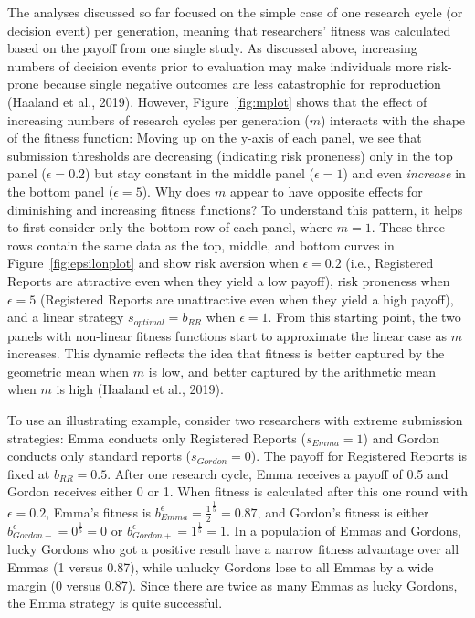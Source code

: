 \documentclass[
  ,man,mask,floatsintext]{apa6}
\begin{document}
The analyses discussed so far focused on the simple case of one research cycle (or decision event) per generation, meaning that researchers' fitness was calculated based on the payoff from one single study.
As discussed above, increasing numbers of decision events prior to evaluation may make individuals more risk-prone because single negative outcomes are less catastrophic for reproduction (Haaland et al., 2019).
However, Figure~\ref{fig:mplot} shows that the effect of increasing numbers of research cycles per generation (\(m\)) interacts with the shape of the fitness function:
Moving up on the y-axis of each panel, we see that submission thresholds are decreasing (indicating risk proneness) only in the top panel (\(\epsilon = 0.2\)) but stay constant in the middle panel (\(\epsilon = 1\)) and even \emph{increase} in the bottom panel (\(\epsilon = 5\)).
Why does \(m\) appear to have opposite effects for diminishing and increasing fitness functions?
To understand this pattern, it helps to first consider only the bottom row of each panel, where \(m = 1\).
These three rows contain the same data as the top, middle, and bottom curves in Figure~\ref{fig:epsilonplot} and show risk aversion when \(\epsilon = 0.2\) (i.e., Registered Reports are attractive even when they yield a low payoff), risk proneness when \(\epsilon = 5\) (Registered Reports are unattractive even when they yield a high payoff), and a linear strategy \(s_{optimal} = b_{RR}\) when \(\epsilon = 1\).
From this starting point, the two panels with non-linear fitness functions start to approximate the linear case as \(m\) increases.
This dynamic reflects the idea that fitness is better captured by the geometric mean when \(m\) is low, and better captured by the arithmetic mean when \(m\) is high (Haaland et al., 2019).

To use an illustrating example, consider two researchers with extreme submission strategies:
Emma conducts only Registered Reports (\(s_{Emma} = 1\)) and Gordon conducts only standard reports (\(s_{Gordon} = 0\)).
The payoff for Registered Reports is fixed at \(b_{RR} = 0.5\).
After one research cycle, Emma receives a payoff of 0.5 and Gordon receives either 0 or 1.
When fitness is calculated after this one round with \(\epsilon = 0.2\), Emma's fitness is \(b_{Emma}^{\epsilon} = \frac{1}{2}^{\frac{1}{5}} = 0.87\), and Gordon's fitness is either \(b_{Gordon-}^{\epsilon} = 0^{\frac{1}{5}} = 0\) or \(b_{Gordon+}^{\epsilon} = 1^{\frac{1}{5}} = 1\).
In a population of Emmas and Gordons, lucky Gordons who got a positive result have a narrow fitness advantage over all Emmas (1 versus 0.87), while unlucky Gordons lose to all Emmas by a wide margin (0 versus 0.87).
Since there are twice as many Emmas as lucky Gordons, the Emma strategy is quite successful.
\end{document}
